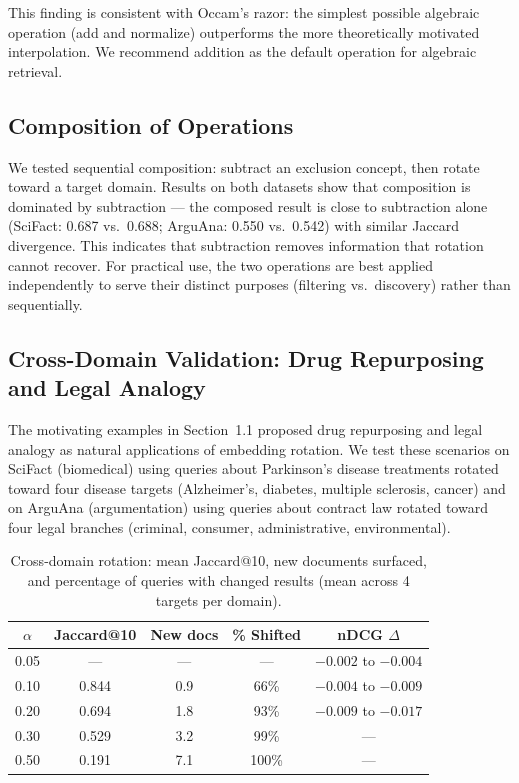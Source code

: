 \documentclass{article}
\begin{document}
This finding is consistent with Occam's razor: the simplest possible algebraic operation (add and normalize) outperforms the more theoretically motivated interpolation. We recommend addition as the default operation for algebraic retrieval.

\subsection{Composition of Operations}

We tested sequential composition: subtract an exclusion concept, then rotate toward a target domain. Results on both datasets show that composition is dominated by subtraction --- the composed result is close to subtraction alone (SciFact: 0.687 vs.\ 0.688; ArguAna: 0.550 vs.\ 0.542) with similar Jaccard divergence. This indicates that subtraction removes information that rotation cannot recover. For practical use, the two operations are best applied independently to serve their distinct purposes (filtering vs.\ discovery) rather than sequentially.

\subsection{Cross-Domain Validation: Drug Repurposing and Legal Analogy}

The motivating examples in Section~1.1 proposed drug repurposing and legal analogy as natural applications of embedding rotation. We test these scenarios on SciFact (biomedical) using queries about Parkinson's disease treatments rotated toward four disease targets (Alzheimer's, diabetes, multiple sclerosis, cancer) and on ArguAna (argumentation) using queries about contract law rotated toward four legal branches (criminal, consumer, administrative, environmental).

\begin{table}[ht]
\centering
\caption{Cross-domain rotation: mean Jaccard@10, new documents surfaced, and percentage of queries with changed results (mean across 4 targets per domain).}
\label{tab:crossdomain}
\begin{tabular}{ccccc}
\toprule
$\alpha$ & Jaccard@10 & New docs & \% Shifted & nDCG $\Delta$ \\
\midrule
0.05 & --- & --- & --- & $-0.002$ to $-0.004$ \\
0.10 & 0.844 & 0.9 & 66\% & $-0.004$ to $-0.009$ \\
0.20 & 0.694 & 1.8 & 93\% & $-0.009$ to $-0.017$ \\
0.30 & 0.529 & 3.2 & 99\% & --- \\
0.50 & 0.191 & 7.1 & 100\% & --- \\
\bottomrule
\end{tabular}
\end{table}
\end{document}
